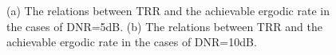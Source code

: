 \documentclass[9pt,twocolumn,twoside]{osajnl}
\begin{document}
\begin{figure}[]
  \centering
  \caption{(a) The relations between TRR and the achievable ergodic rate in the cases of DNR=5dB. (b) The relations between TRR and the achievable ergodic rate in the cases of DNR=10dB.}
  \label{fig:TRR_R}
\end{figure}
\end{document}

